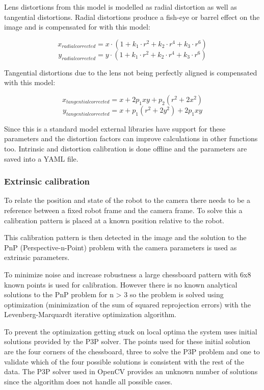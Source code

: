 Lens distortions from this model is modelled as radial distortion as well as tangential distortions. Radial distortions produce a fish-eye or barrel effect on the image and is compensated for with this model:

\[x_{radialcorrected} = x\cdot (1+k_1\cdot r^2 + k_2\cdot r^4 + k_3\cdot r^6)\]
\[y_{radialcorrected} = y\cdot (1+k_1\cdot r^2 + k_2\cdot r^4 + k_3\cdot r^6)\]

Tangential distortions due to the lens not being perfectly aligned is compensated with this model:

\[x_{tangentialcorrected} = x + 2p_1xy+p_2(r^2+2x^2)\]
\[y_{tangentialcorrected} = x + p_1(r^2+2y^2)+2p_1xy\]

Since this is a standard model external libraries have support for these parameters and the distortion factors can improve calculations in other functions too. Intrinsic and distortion calibration is done offline and the parameters are saved into a YAML file.

\subsubsection{Extrinsic calibration}
To relate the position and state of the robot to the camera there needs to be a reference between a fixed robot frame and the camera frame. To solve this a calibration pattern is placed at a known position relative to the robot.

This calibration pattern is then detected in the image and the solution to the PnP (Perspective-n-Point) problem with the camera parameters is used as extrinsic parameters.

To minimize noise and increase robustness a large chessboard pattern with 6x8 known points is used for calibration. However there is no known analytical solutions to the PnP problem for n > 3 so the problem is solved using optimization (minimization of the sum of squared reprojection errors) with the Levenberg-Marquardt iterative optimization algorithm.

To prevent the optimization getting stuck on local optima the system uses initial solutions provided by the P3P solver.
The points used for these initial solution are the four corners of the chessboard, three to solve the P3P problem and one to validate which of the four possible solutions is consistent with the rest of the data.
The P3P solver used in OpenCV provides an unknown number of solutions since the algorithm does not handle all possible cases. 

